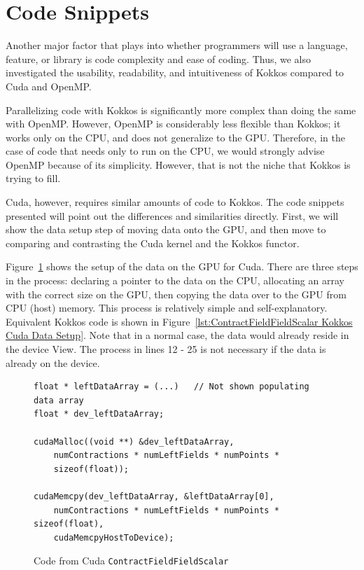\section{Code Snippets}
Another major factor that plays into whether programmers will use a language,
feature, or library is code complexity and ease of coding. Thus, we also
investigated the usability, readability, and intuitiveness of Kokkos compared to
Cuda and OpenMP.

Parallelizing code with Kokkos is significantly more complex than doing the same
with OpenMP.  However, OpenMP is considerably less flexible than Kokkos; it
works only on the CPU, and does not generalize to the GPU.  Therefore, in the
case of code that needs only to run on the CPU, we would strongly advise OpenMP
because of its simplicity.  However, that is not the niche that Kokkos is trying
to fill. 

Cuda, however, requires similar amounts of code to Kokkos.  The code snippets
presented will point out the differences and similarities directly.  First, we
will show the data setup step of moving data onto the GPU, and then move to
comparing and contrasting the Cuda kernel and the Kokkos functor.

Figure~\ref{lst:ContractFieldFieldScalar Cuda Data Setup} shows the setup of the data on the GPU for Cuda. 
There are three steps in the process: declaring a pointer to the data on the
CPU, allocating an array with the correct size on the GPU, then copying the data
over to the GPU from CPU (host) memory. This process is relatively simple and
self-explanatory. 
Equivalent Kokkos code is shown in Figure~\ref{lst:ContractFieldFieldScalar
Kokkos Cuda Data Setup}. Note that in a normal case, the data would already reside in the device View. The process in lines 12 - 25 is not necessary if the data is already on the device.

\begin{figure}[!htb]
	\begin{lstlisting}
float * leftDataArray = (...)	// Not shown populating data array
float * dev_leftDataArray;

cudaMalloc((void **) &dev_leftDataArray, 
	numContractions * numLeftFields * numPoints * 
	sizeof(float));
	
cudaMemcpy(dev_leftDataArray, &leftDataArray[0], 
	numContractions * numLeftFields * numPoints * sizeof(float), 
	cudaMemcpyHostToDevice);
	\end{lstlisting}

\caption{Code from Cuda \texttt{ContractFieldFieldScalar}
\label{lst:ContractFieldFieldScalar Cuda Data Setup}}
\end{figure}


